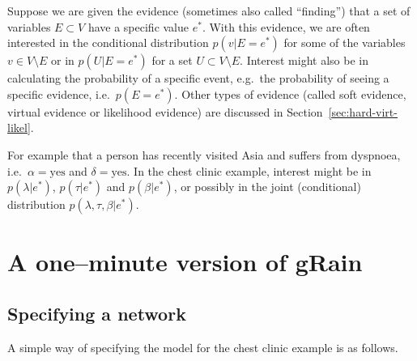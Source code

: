 \documentclass[10pt]{article}\usepackage[]{graphicx}\usepackage[]{color}
\def\grbn{{\bf gRain}}
\begin{document}
Suppose we are given the evidence (sometimes also called ``finding'')
that a set of variables $E\subset V$
have a specific value $e^*$.
With this evidence, we are often interested in the conditional
distribution $p(v|E=e^*)$
for some of the variables $v \in V \setminus E$
or in $p(U|E=e^*)$
for a set $U\subset V \setminus E$. Interest might also be in
calculating the probability of a specific event, e.g.\ the probability
of seeing a specific evidence, i.e.\ $p(E=e^*)$.
Other types of evidence (called soft evidence, virtual evidence or likelihood evidence) are discussed in
Section~\ref{sec:hard-virt-likel}.

For
example that a person has recently visited Asia and suffers from
dyspnoea, i.e.\ $\alpha=\mbox{yes}$ and $\delta=\mbox{yes}$.
In the chest clinic example, interest might be in $p(\lambda|e^*)$, $p(\tau|e^*)$
and  $p(\beta|e^*)$, or possibly in the joint (conditional) distribution
$p(\lambda,\tau,\beta|e^*)$.


\section{A one--minute version of  \grbn{}}
\label{sec:oneminute}

\subsection{Specifying a network}
\label{sec:specifying-network}

A simple way of  specifying the model for the chest clinic
example is as follows.
\end{document}
